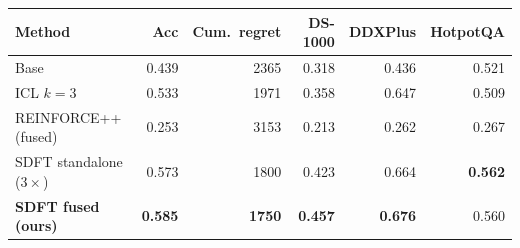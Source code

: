 \begin{tabular}{lrrrrr}
\toprule
Method & Acc & Cum.\ regret & DS-1000 & DDXPlus & HotpotQA \\
\midrule
Base & 0.439 & 2365 & 0.318 & 0.436 & 0.521 \\
ICL $k{=}3$ & 0.533 & 1971 & 0.358 & 0.647 & 0.509 \\
REINFORCE++ (fused) & 0.253 & 3153 & 0.213 & 0.262 & 0.267 \\
SDFT standalone ($3\times$) & 0.573 & 1800 & 0.423 & 0.664 & \textbf{0.562} \\
\textbf{SDFT fused (ours)} & \textbf{0.585} & \textbf{1750} & \textbf{0.457} & \textbf{0.676} & 0.560 \\
\bottomrule
\end{tabular}
